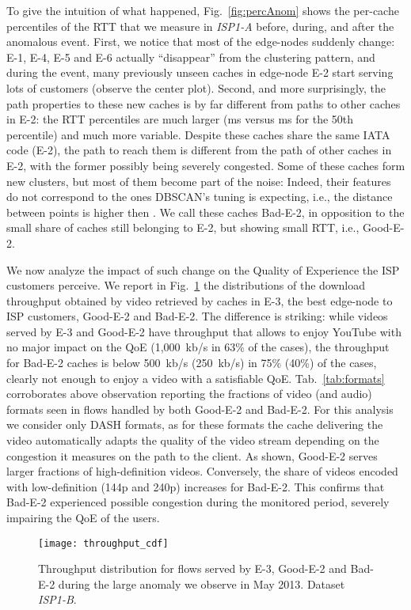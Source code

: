 \documentclass{acm_proc_article-sp}
\newcommand{\node}{{edge-node}\xspace}
\newcommand{\nodes}{{edge-nodes}\xspace}
\newcommand{\TApub}{\textit{ISP1-A}\xspace}
\newcommand{\TApri}{\textit{ISP1-B}\xspace}
\newcommand{\AMS}{E-1\xspace} \newcommand{\FRA}{E-2\xspace} \newcommand{\MIL}{E-3\xspace} \newcommand{\SWI}{E-4\xspace} \newcommand{\SWII}{E-5\xspace} \newcommand{\LND}{E-6\xspace} \newcommand{\MAD}{E-7\xspace}
\begin{document}
To give the intuition of what happened, Fig.~\ref{fig:percAnom} shows the per-cache percentiles of the RTT that we measure in \TApub before, during, and after the anomalous event. 
First, we notice that most of the \nodes suddenly change: \AMS, \SWI, \SWII and \LND actually ``disappear'' from the clustering pattern, and during the event, many previously unseen caches in \node \FRA start serving lots of customers (observe the center plot). Second, and more surprisingly, the path properties to these new caches is by far different from paths to other caches in \FRA: the RTT percentiles are much larger (ms versus ms for the 50th percentile) and much more variable.
Despite these caches share the same IATA code (\FRA), the path to reach them is different from the path of other caches in \FRA, with the former possibly being severely congested. Some of these caches form new clusters, but most of them become part of the noise: Indeed, their features do not correspond to the ones DBSCAN's tuning is expecting, i.e., the distance between points is higher then . We call these caches Bad-\FRA, in opposition to the small share of caches still belonging to \FRA, but showing small RTT, i.e., Good-\FRA.

We now analyze the impact of such change on the Quality of Experience the ISP customers perceive. We report in Fig.~\ref{fig:thru} the distributions of the download throughput obtained by video retrieved by caches in \MIL, the best \node to ISP customers, Good-\FRA and Bad-\FRA. The difference is striking: while videos served by \MIL and Good-\FRA have throughput that allows to enjoy YouTube with no major impact on the QoE (1,000~kb/s in 63\% of the cases), the throughput for Bad-\FRA caches is below 500~kb/s (250~kb/s) in 75\% (40\%) of the cases, clearly not enough to enjoy a video with a satisfiable QoE.
Tab.~\ref{tab:formats} corroborates above observation reporting the fractions of video (and audio) formats seen in flows handled by both Good-\FRA and Bad-\FRA. For this analysis we consider only DASH formats, as for these formats the cache delivering the video automatically adapts the quality of the video stream depending on the congestion it measures on the path to the client.  As shown,  Good-\FRA serves larger fractions of high-definition videos. Conversely,  the share of videos encoded with low-definition (144p and 240p) increases for Bad-\FRA. This confirms that Bad-\FRA experienced possible congestion during the monitored period, severely impairing the QoE of the users.

\begin{figure}[t!]
\centering
    \texttt{[image: throughput\_cdf]}
    \caption{Throughput distribution for flows served by \MIL, Good-\FRA and Bad-\FRA during the large anomaly we observe in May 2013. Dataset \TApri.}
    \label{fig:thru}
\end{figure}
\end{document}
